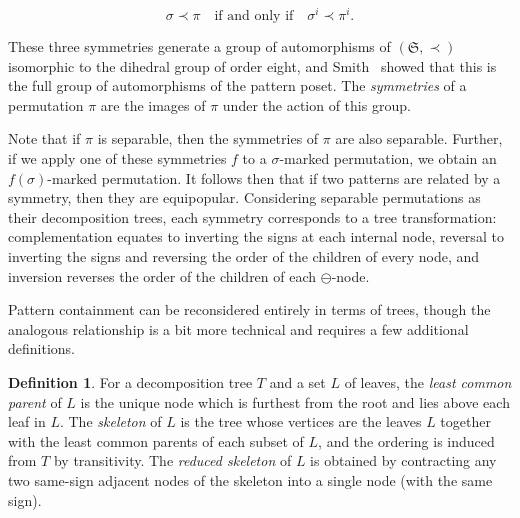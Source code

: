 \documentclass[10pt]{article}
\theoremstyle{definition}
\newtheorem{definition}[theorem]{Definition}
\numberwithin{equation}{section}
\numberwithin{figure}{section}
\begin{document}
\begin{equation} \label{eqn:symmetry}
\sigma \prec \pi \quad \text{if and only if} \quad \sigma^i \prec \pi^i. 
\end{equation}
  
These three symmetries generate a group of automorphisms of $(\mathfrak{S}, \prec)$ isomorphic to the dihedral group of order eight, and Smith~\cite{smith:permutation-rec:} showed that this is the full group of automorphisms of the pattern poset. The \emph{symmetries} of a permutation $\pi$ are the images of $\pi$ under the action of this group. 

Note that if $\pi$ is separable, then the symmetries of $\pi$ are also separable. Further, if we apply one of these symmetries $f$ to a $\sigma$-marked permutation, we obtain an $f(\sigma)$-marked permutation. It follows then that if two patterns are related by a symmetry, then they are equipopular.  Considering separable permutations as their decomposition trees, each symmetry corresponds to a tree transformation: complementation equates to inverting the signs at each internal node, reversal to inverting the signs and reversing the order of the children of every node, and inversion reverses the order of the children of each $\ominus$-node. 

Pattern containment can be reconsidered entirely in terms of trees, though the analogous relationship is a bit more technical and requires a few additional definitions. 

\begin{definition}
For a decomposition tree $T$ and a set $L$ of leaves, the \emph{least common parent} of $L$ is the unique node which is furthest from the root and lies above each leaf in $L$. The \emph{skeleton} of $L$ is the tree whose vertices are the leaves $L$ together with the least common parents of each subset of $L$, and the ordering is induced from $T$ by transitivity.  The \emph{reduced skeleton} of $L$ is obtained by contracting any two same-sign adjacent nodes of the skeleton into a single node (with the same sign). 
\end{definition}
\end{document}
